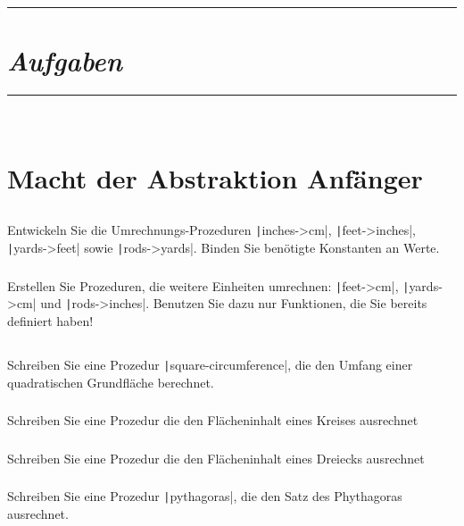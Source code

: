 \documentclass[a4paper,12pt,twoside]{article}
\begin{document}
\setcounter{secnumdepth}{5}
\clearpage
\newpage
\appendix
\hrule
{}
\section*{\emph{Aufgaben}}
\hrule\ \\
\section{Macht der Abstraktion Anfänger}
\subsection{}
\subsubsection{}
Entwickeln Sie die Umrechnungs-Prozeduren
\texttt|inches->cm|, \texttt|feet->inches|,  \texttt|yards->feet| sowie \texttt|rods->yards|. Binden Sie benötigte Konstanten an Werte.
\subsubsection{}
Erstellen Sie Prozeduren, die weitere Einheiten umrechnen: \texttt|feet->cm|, \texttt|yards->cm| und \texttt|rods->inches|. Benutzen Sie dazu nur Funktionen, die Sie bereits definiert haben!
\subsection{}
\subsubsection{}
Schreiben Sie eine Prozedur \texttt|square-circumference|, die den Umfang einer quadratischen Grundfläche berechnet.
\subsubsection{}
Schreiben Sie eine Prozedur die den Flächeninhalt eines Kreises ausrechnet
\subsubsection{}
Schreiben Sie eine Prozedur die den Flächeninhalt eines Dreiecks ausrechnet
\subsubsection{}
Schreiben Sie eine Prozedur \texttt|pythagoras|, die den Satz des Phythagoras ausrechnet.
\end{document}

